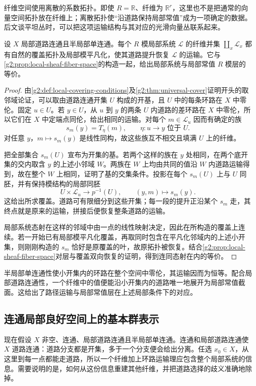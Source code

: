 纤维空间使用离散的系数拓扑。即使 \(R=\mathbb R\)、纤维为 \(\mathbb R^r\)，这里也不是把通常的向量空间拓扑放在纤维上；离散拓扑使“沿道路保持局部常值”成为一项确定的数据。后文谈平坦丛时，可以把这项运输结构与其对应的光滑向量丛联系起来。

\begin{proposition}\label{g2:prop:local-system-realization}
	设 \(X\) 局部道路连通且半局部单连通。每个 \(R\) 模局部系统 \(\mathcal L\) 的纤维并集 \(\coprod_x\mathcal L_x\) 都有自然的覆盖拓扑及局部模平凡化，使其道路提升恢复 \(\mathcal L\) 的运输。它与\cref{g2:prop:local-sheaf-fiber-space}的构造一起，给出局部系统与局部常值 \(R\) 模层的等价。
\end{proposition}
\begin{proof}
	由\cref{g2:def:local-covering-conditions}及\cref{g2:thm:universal-cover}证明开头的取邻域论证，可以取由道路连通开集 \(U\) 构成的开基，且 \(U\) 中的每条环路在 \(X\) 中零伦。固定 \(u\in U\)。若 \(y\in U\)，从 \(u\) 到 \(y\) 的两条 \(U\) 内道路的差环路在 \(X\) 中零伦，所以它们在 \(X\) 中定端点同伦，给出相同的运输。对每个 \(m\in\mathcal L_u\) 因而有确定的族
	\[
		s_m(y)=T_\eta(m),\qquad \eta:u\to y\text{ 位于 }U.
	\]
	对任意 \(y\)，\(m\mapsto s_m(y)\) 是线性同构，故这些族互不相交且填满 \(U\) 上的纤维。

	把全部集合 \(s_m(U)\) 宣布为开集的基。若两个这样的族在 \(y\) 处相同，在两个底开集的交内取含 \(y\) 的上述小邻域 \(W\)。两族在 \(W\) 上均由共同的值沿 \(W\) 内道路运输得到，故在整个 \(W\) 上相同，证明了基的交集条件。投影在每个 \(s_m(U)\) 上与 \(U\) 同胚，并有保持模结构的局部同胚
	\[
		U\times\mathcal L_u\longrightarrow p^{-1}(U),\qquad(y,m)\longmapsto s_m(y).
	\]
	这给出所求覆盖。道路可有限细分到这些开集；每一段的提升正沿某个 \(s_m\) 走，其终点就是原来的运输，拼接后便恢复整条道路的运输。

	局部系统态射在这样的邻域中由一点的线性映射决定，因此在所构造的覆盖上连续。若一开始已有局部模平凡化覆盖，再取同时包含在平凡化邻域内的上述小开集，则刚刚构造的 \(s_m\) 恰好是原覆盖的叶，故原拓扑被恢复。结合\cref{g2:prop:local-sheaf-fiber-space}对层与覆盖双向恢复的证明，得到连同态射在内的等价。
\end{proof}

半局部单连通性使小开集内的环路在整个空间中零伦，其运输因而为恒等。配合局部道路连通性，一个纤维中的值便能沿小开集内的道路唯一地展开为局部常值截面。这给出了路径运输与局部常值层在上述局部条件下的对应。

\subsection{连通局部良好空间上的基本群表示}
\label{g2:subsec:0501:03}
现在假设 \(X\) 非空、连通、局部道路连通且半局部单连通。连通和局部道路连通使 \(X\) 道路连通：道路分支都是开集，多于一个分支便会给出分离。任选 \(x_0\in X\)，从这里到每一点都能走道路，所以一个纤维加上环路运输理应包含整个局部系统的信息。需要说明的是，如何从这份信息重建其他纤维，并把道路选择的歧义准确地除掉。

